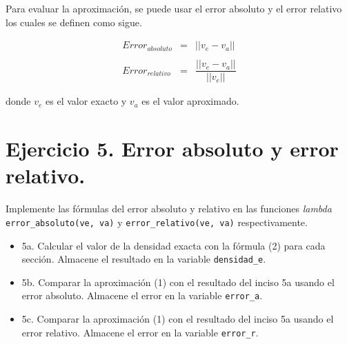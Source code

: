 \documentclass[
  letterpaper,
  DIV=11,
  numbers=noendperiod]{scrreprt}
\providecommand{\tightlist}{%
  \setlength{\itemsep}{0pt}\setlength{\parskip}{0pt}}\usepackage{longtable,booktabs,array}
\begin{document}
Para evaluar la aproximación, se puede usar el error absoluto y el error
relativo los cuales se definen como sigue.

\[
\begin{eqnarray*}
Error_{absoluto} & = & ||v_e - v_a|| \\ \\
Error_{relativo} & = & \dfrac{||v_e - v_a||}{||v_e||}
\end{eqnarray*}
\]

donde \(v_e\) es el valor exacto y \(v_a\) es el valor aproximado.

\section{Ejercicio 5. Error absoluto y error
relativo.}\label{ejercicio-5.-error-absoluto-y-error-relativo.}

Implemente las fórmulas del error absoluto y relativo en las funciones
\emph{lambda} \texttt{error\_absoluto(ve,\ va)} y
\texttt{error\_relativo(ve,\ va)} respectivamente.

\begin{itemize}
\tightlist
\item
  5a. Calcular el valor de la densidad exacta con la fórmula (2) para
  cada sección. Almacene el resultado en la variable
  \texttt{densidad\_e}.
\item
  5b. Comparar la aproximación (1) con el resultado del inciso 5a usando
  el error absoluto. Almacene el error en la variable \texttt{error\_a}.
\item
  5c. Comparar la aproximación (1) con el resultado del inciso 5a usando
  el error relativo. Almacene el error en la variable \texttt{error\_r}.
\end{itemize}
\end{document}
